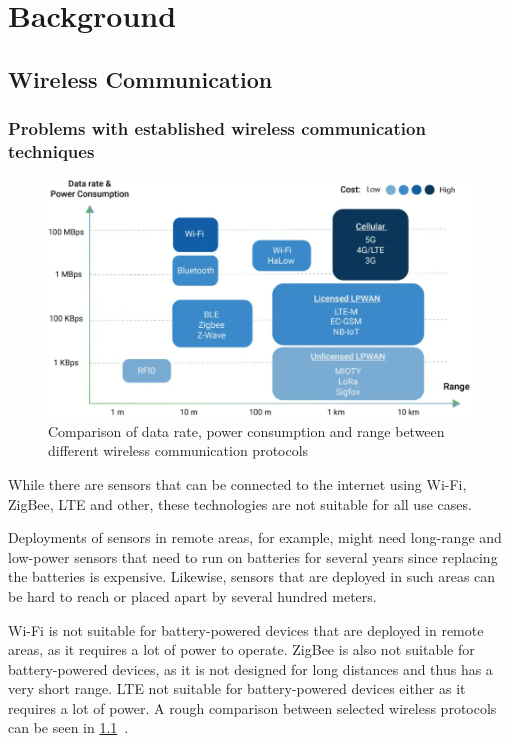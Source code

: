 \chapter{Background}

\section{Wireless Communication}


\subsection{Problems with established wireless communication techniques}

\begin{figure}[h]
    \centering
    \includegraphics[width=1\textwidth]{pictures/lora/comparison-wireless-protocols.png}
    \caption{Comparison of data rate, power consumption and range between different wireless communication protocols~\protect\cite{wang_comparison_2021}}\label{pic:wireless-protocols-comparison}
\end{figure}


While there are sensors that can be connected to the internet using Wi-Fi, ZigBee, \ac{LTE} and other, these technologies are not suitable for all use cases.

Deployments of sensors in remote areas, for example, might need long-range and low-power sensors that need to run on batteries for several years since replacing the batteries is expensive.
Likewise, sensors that are deployed in such areas can be hard to reach or placed apart by several hundred meters.

Wi-Fi is not suitable for battery-powered devices that are deployed in remote areas, as it requires a lot of power to operate.
ZigBee is also not suitable for battery-powered devices, as it is not designed for long distances and thus has a very short range.
\ac{LTE} not suitable for battery-powered devices either as it requires a lot of power.
A rough comparison between selected wireless protocols can be seen in \cref{pic:wireless-protocols-comparison}~\cite{wang_comparison_2021}.

